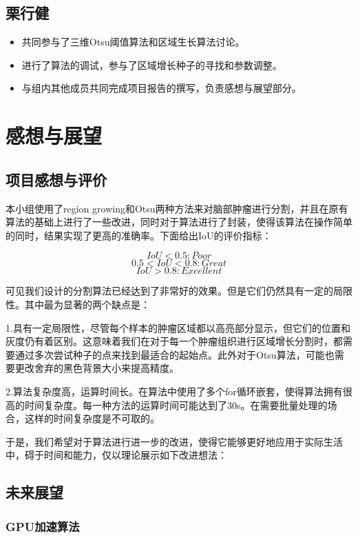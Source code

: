 \documentclass[UTF8]{ctexart}
\begin{document}
\subsection{栗行健}
\begin{itemize}
    \item 共同参与了三维Otsu阈值算法和区域生长算法讨论。
    \item 进行了算法的调试，参与了区域增长种子的寻找和参数调整。
    \item 与组内其他成员共同完成项目报告的撰写，负责感想与展望部分。
    
\end{itemize}

\section{感想与展望}
	
	\subsection{项目感想与评价}

	本小组使用了region growing和Otsu两种方法来对脑部肿瘤进行分割，并且在原有算法的基础上进行了一些改进，同时对于算法进行了封装，使得该算法在操作简单的同时，结果实现了更高的准确率。下面给出IoU的评价指标：

	$$ IoU <{0.5} : Poor $$
	$$ {0.5}<IoU<{0.8} : Great $$
	$$ IoU>{0.8} : Excellent $$

	可见我们设计的分割算法已经达到了非常好的效果。但是它们仍然具有一定的局限性。其中最为显著的两个缺点是：

	1.具有一定局限性，尽管每个样本的肿瘤区域都以高亮部分显示，但它们的位置和灰度仍有着区别。这意味着我们在对于每一个肿瘤组织进行区域增长分割时，都需要通过多次尝试种子的点来找到最适合的起始点。此外对于Otsu算法，可能也需要更改舍弃的黑色背景大小来提高精度。

	2.算法复杂度高，运算时间长。在算法中使用了多个for循环嵌套，使得算法拥有很高的时间复杂度。每一种方法的运算时间可能达到了30s。在需要批量处理的场合，这样的时间复杂度是不可取的。

	于是，我们希望对于算法进行进一步的改进，使得它能够更好地应用于实际生活中，碍于时间和能力，仅以理论展示如下改进想法：

	\subsection{未来展望}

	\subsubsection{GPU加速算法}
\end{document}
